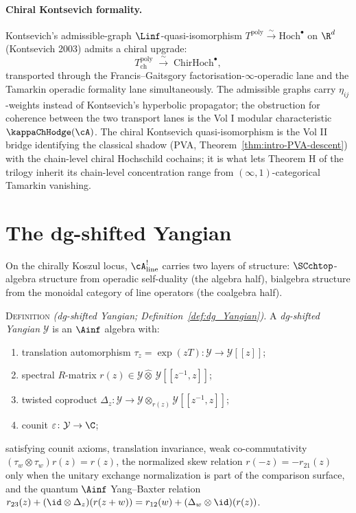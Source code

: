 \paragraph{Chiral Kontsevich formality.}
Kontsevich's admissible-graph $\Linf$-quasi-isomorphism
$T^{\mathrm{poly}} \xrightarrow{\sim} \mathrm{Hoch}^\bullet$
on $\R^d$ (Kontsevich 2003) admits a chiral upgrade:
\[
 T^{\mathrm{poly}}_{\mathrm{ch}}
 \;\xrightarrow{\;\sim\;}\;
 \mathrm{ChirHoch}^\bullet,
\]
transported through the Francis--Gaitsgory
factorisation-$\infty$-operadic lane and the Tamarkin operadic
formality lane simultaneously. The admissible graphs carry
$\eta_{ij}$-weights instead of Kontsevich's hyperbolic
propagator; the obstruction for coherence between the two
transport lanes is the Vol I modular characteristic
$\kappaChHodge(\cA)$. The chiral Kontsevich
quasi-isomorphism is the Vol II bridge identifying the classical
shadow (PVA, Theorem~\ref{thm:intro-PVA-descent}) with the
chain-level chiral Hochschild cochains; it is what lets Theorem
H of the trilogy inherit its chain-level concentration range
from $(\infty, 1)$-categorical Tamarkin vanishing.

\section*{The dg-shifted Yangian}

On the chirally Koszul locus, $\cA^!_{\mathrm{line}}$ carries
two layers of structure: $\SCchtop$-algebra structure from
operadic self-duality (the algebra half), bialgebra structure
from the monoidal category of line operators (the coalgebra
half).

\noindent\textsc{Definition}
\textit{(dg-shifted Yangian; Definition~\textup{\ref{def:dg_Yangian}}).}
A \emph{dg-shifted Yangian} $\mathcal{Y}$ is an $\Ainf$ algebra
with:
\begin{enumerate}[label=(\roman*)]
\item translation automorphism
 $\tau_z = \exp(zT)\colon \mathcal{Y} \to \mathcal{Y}[[z]]$;
\item spectral $R$-matrix
 $r(z) \in \mathcal{Y} \widehat{\otimes}\, \mathcal{Y}[[z^{-1}, z]]$;
\item twisted coproduct $\Delta_z\colon \mathcal{Y} \to
 \mathcal{Y} \otimes_{r(z)} \mathcal{Y}[[z^{-1}, z]]$;
\item counit $\varepsilon\colon \mathcal{Y} \to \C$;
\end{enumerate}
	satisfying counit axioms, translation invariance,
	weak co-commutativity $(\tau_w\otimes\tau_w)r(z)=r(z)$,
	the normalized skew relation $r(-z)=-r_{21}(z)$ only when the
	unitary exchange normalization is part of the comparison surface,
	and the quantum $\Ainf$ Yang--Baxter relation
	$r_{23}(z) + (\id \otimes \Delta_z)(r(z+w)) =
	r_{12}(w) + (\Delta_w \otimes \id)(r(z))$.


